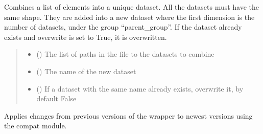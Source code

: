 \documentclass[letterpaper,10pt,english]{sphinxmanual}
\begin{document}
\begin{fulllineitems}
\begin{fulllineitems}
\label{\detokenize{source/_autosummary/HDF5_BLS.Wrapper:HDF5_BLS.Wrapper.combine_datasets}}
\pysigstartsignatures
\pysiglinewithargsret
{}
{\sphinxparamcomma {}\sphinxparamcomma {}\sphinxparamcomma {}}
{}
\pysigstopsignatures
\sphinxAtStartPar
Combines a list of elements into a unique dataset. All the datasets must have the same shape. They are added into a new dataset where the first dimension is the number of datasets, under the group “parent\_group”. If the dataset already exists and overwrite is set to True, it is overwritten.
\begin{quote}\begin{description}
\begin{itemize}
\item {} 
\sphinxAtStartPar
{} () \textendash{} The list of paths in the file to the datasets to combine

\item {} 
\sphinxAtStartPar
{} () \textendash{} The name of the new dataset

\item {} 
\sphinxAtStartPar
{} (\sphinxstyleliteralemphasis{\sphinxupquote{, }}) \textendash{} If a dataset with the same name already exists, overwrite it, by default False

\end{itemize}

\end{description}\end{quote}

\end{fulllineitems}


\begin{fulllineitems}
\label{\detokenize{source/_autosummary/HDF5_BLS.Wrapper:HDF5_BLS.Wrapper.compatibility_changes}}
\pysigstartsignatures
\pysiglinewithargsret
{}
{}
{}
\pysigstopsignatures
\sphinxAtStartPar
Applies changes from previous versions of the wrapper to newest versions using the compat module.


\end{fulllineitems}
\end{fulllineitems}
\end{document}
